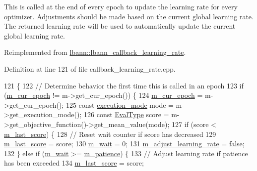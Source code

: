 This is called at the end of every epoch to update the learning rate for every optimizer. Adjustments should be made based on the current global learning rate. The returned learning rate will be used to automatically update the current global learning rate. 

Reimplemented from \hyperlink{classlbann_1_1lbann__callback__learning__rate_a7869b93e5963d6f76da68d8c8137b979}{lbann\+::lbann\+\_\+callback\+\_\+learning\+\_\+rate}.



Definition at line 121 of file callback\+\_\+learning\+\_\+rate.\+cpp.


\begin{DoxyCode}
121                                                                      \{
122   \textcolor{comment}{// Determine behavior the first time this is called in an epoch}
123   \textcolor{keywordflow}{if} (\hyperlink{classlbann_1_1lbann__callback__adaptive__learning__rate_a740b8b3bbb47312b48322f440f703222}{m\_cur\_epoch} != m->get\_cur\_epoch()) \{
124     \hyperlink{classlbann_1_1lbann__callback__adaptive__learning__rate_a740b8b3bbb47312b48322f440f703222}{m\_cur\_epoch} = m->get\_cur\_epoch();
125     \textcolor{keyword}{const} \hyperlink{base_8hpp_a2781a159088df64ed7d47cc91c4dc0a8}{execution\_mode} mode = m->get\_execution\_mode();
126     \textcolor{keyword}{const} \hyperlink{base_8hpp_a3266f5ac18504bbadea983c109566867}{EvalType} score = m->get\_objective\_function()->get\_mean\_value(mode);
127     \textcolor{keywordflow}{if} (score < \hyperlink{classlbann_1_1lbann__callback__adaptive__learning__rate_a7aa8aeed3df9cca131ace1ea9fbf1cd3}{m\_last\_score}) \{
128       \textcolor{comment}{// Reset wait counter if score has decreased}
129       \hyperlink{classlbann_1_1lbann__callback__adaptive__learning__rate_a7aa8aeed3df9cca131ace1ea9fbf1cd3}{m\_last\_score} = score;
130       \hyperlink{classlbann_1_1lbann__callback__adaptive__learning__rate_aecfb70e4a366762305a2dbd8248471de}{m\_wait} = 0;
131       \hyperlink{classlbann_1_1lbann__callback__adaptive__learning__rate_aa3de3b7d67b5295058e9c2175d06212d}{m\_adjust\_learning\_rate} = \textcolor{keyword}{false};
132     \} \textcolor{keywordflow}{else} \textcolor{keywordflow}{if} (\hyperlink{classlbann_1_1lbann__callback__adaptive__learning__rate_aecfb70e4a366762305a2dbd8248471de}{m\_wait} >= \hyperlink{classlbann_1_1lbann__callback__adaptive__learning__rate_ac3ac3c4d34d62608c54dfa3a41691217}{m\_patience}) \{
133       \textcolor{comment}{// Adjust learning rate if patience has been exceeded}
134       \hyperlink{classlbann_1_1lbann__callback__adaptive__learning__rate_a7aa8aeed3df9cca131ace1ea9fbf1cd3}{m\_last\_score} = score;

\end{DoxyCode}
